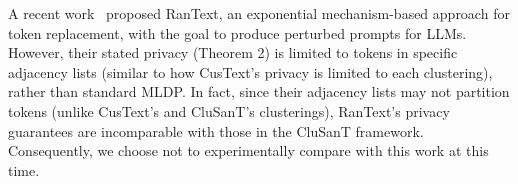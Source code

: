 \documentclass[11pt]{article}
\newcommand{\clusant}{CluSanT\xspace}
\begin{document}

A recent work~\cite{tong2023privinfer} proposed RanText, an exponential mechanism-based approach for token replacement, with the goal to produce perturbed prompts for LLMs. 
However, their stated privacy (Theorem 2) is limited to tokens in specific adjacency lists (similar to how CusText's privacy is limited to each clustering), rather than standard MLDP. In fact, since their adjacency lists may not partition tokens (unlike CusText's and \clusant's clusterings), RanText's privacy guarantees are incomparable with those in the \clusant framework.   %
Consequently, we choose not to experimentally compare with this work at this time.
%
\end{document}
